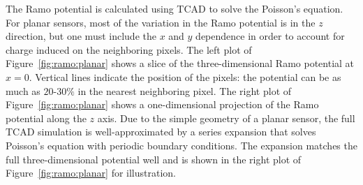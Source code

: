 

The Ramo potential is calculated using TCAD to solve the Poisson's equation.  For planar sensors, most of the variation in the Ramo potential is in the $z$ direction, but one must include the $x$ and $y$ dependence in order to account for charge induced on the neighboring pixels.  The left plot of Figure~\ref{fig:ramo:planar} shows a slice of the three-dimensional Ramo potential at $x=0$.  Vertical lines indicate the position of the pixels: the potential can be as much as $20$-$30\%$ in the nearest neighboring pixel.  The right plot of Figure~\ref{fig:ramo:planar} shows a one-dimensional projection of the Ramo potential along the $z$ axis.  Due to the simple geometry of a planar sensor, the full TCAD simulation is well-approximated by a series expansion that solves Poisson's equation with periodic boundary conditions.  The expansion matches the full three-dimensional potential well and is shown in the right plot of Figure~\ref{fig:ramo:planar} for illustration.  

